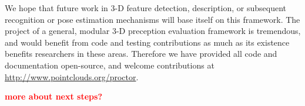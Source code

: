 \documentclass[a4paper, 10pt, conference]{ieeeconf}      %
\newcommand{\note}[1]{\textcolor{red}{\textbf{#1}}}
\begin{document}
We hope that future work in 3-D feature detection, description, or subsequent
recognition or pose estimation mechanisms will base itself on this framework.
The project of a general, modular 3-D preception evaluation framework is
tremendous, and would benefit from code and testing contributions as much as its
existence benefits researchers in these areas.
Therefore we have provided all code and documentation open-source, and welcome
contributions at \url{http://www.pointclouds.org/proctor}.

\note{more about next steps?}

% 

{\small


}
\end{document}
